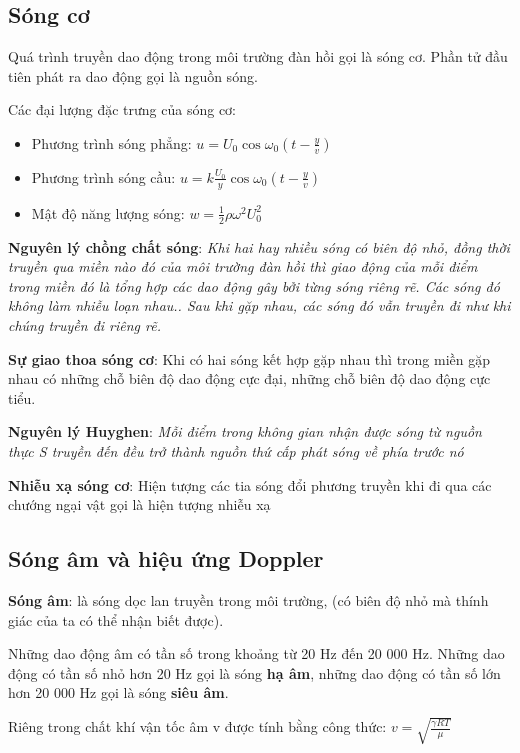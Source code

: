 \documentclass[12pt,a4paper]{article}
\begin{document}
\subsection*{Sóng cơ}

Quá trình truyền dao động trong môi trường đàn hồi gọi là sóng cơ. Phần tử đầu tiên phát ra
dao động gọi là nguồn sóng.

Các đại lượng đặc trưng của sóng cơ:
\begin{itemize}
    \item Phương trình sóng phẳng: $u = U_0 \cos \omega_0 \left(t - \frac{y}{v}\right)$
    \item Phương trình sóng cầu: $u = k \frac{U_0}{y} \cos \omega_0 \left(t - \frac{y}{v}\right)$
    \item Mật độ năng lượng sóng: $w = \frac{1}{2} \rho \omega^2 U_0^2$
\end{itemize}

\textbf{Nguyên lý chồng chất sóng}: \textit{Khi hai hay nhiều sóng có biên độ nhỏ, đồng thời truyền qua
miền nào đó của môi trường đàn hồi thì giao động của mỗi điểm trong miền đó là tổng hợp các
dao động gây bởi từng sóng riêng rẽ. Các sóng đó không làm nhiễu loạn nhau.. Sau khi gặp
nhau, các sóng đó vẫn truyền đi như khi chúng truyền đi riêng rẽ.}

\textbf{Sự giao thoa sóng cơ}: Khi có hai sóng kết hợp gặp nhau thì trong miền gặp nhau có những
chỗ biên độ dao động cực đại, những chỗ biên độ dao động cực tiểu.

\textbf{Nguyên lý Huyghen}: \textit{Mỗi điểm trong không gian nhận được sóng từ nguồn thực S
truyền đến đều trở thành nguồn thứ cấp phát sóng về phía trước nó}

\textbf{Nhiễu xạ sóng cơ}: Hiện tượng các tia sóng đổi phương truyền khi đi qua các chướng ngại vật
gọi là hiện tượng nhiễu xạ

\subsection*{Sóng âm và hiệu ứng Doppler}

\textbf{Sóng âm}: là sóng dọc lan truyền trong môi trường, (có biên độ nhỏ mà thính giác của ta có thể
nhận biết được).

Những dao động âm có tần số trong khoảng từ 20 Hz đến 20 000 Hz. Những dao động có tần số
nhỏ hơn 20 Hz gọi là sóng \textbf{hạ âm}, những dao động có tần số lớn hơn 20 000 Hz gọi là sóng \textbf{siêu
âm}.

Riêng trong chất khí vận tốc âm v được tính bằng công thức: $v = \sqrt{\frac{\gamma R T}{\mu }}$
\end{document}
